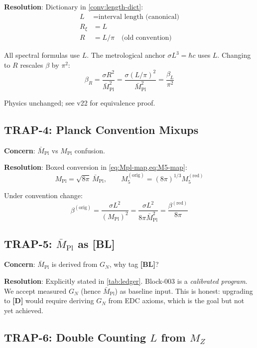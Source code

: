 \documentclass[11pt,a4paper]{article}
\newcommand{\Mpl}{\bar{M}_{\mathrm{Pl}}}
\newcommand{\MplOrig}{M_{\mathrm{Pl}}}
\newcommand{\Mfive}{M_5}
\newcommand{\Rxi}{R_\xi}
\newcommand{\MZ}{M_Z}
\newcommand{\tagD}{\textbf{[D]}}
\newcommand{\tagBL}{\textbf{[BL]}}
\theoremstyle{definition}
\theoremstyle{plain}
\theoremstyle{remark}
\begin{document}
\textbf{Resolution}: Dictionary in \cref{conv:length-dict}:
\begin{align}
L &= \text{interval length (canonical)} \\
\Rxi &= L \\
R &= L/\pi \quad \text{(old convention)}
\end{align}

All spectral formulas use $L$. The metrological anchor $\sigma L^3 = \hbar c$ uses $L$.
Changing to $R$ rescales $\beta$ by $\pi^2$:
\begin{equation}
\beta_R = \frac{\sigma R^2}{\Mpl^2} = \frac{\sigma (L/\pi)^2}{\Mpl^2} = \frac{\beta_L}{\pi^2}
\label{eq:beta-convention-change}
\end{equation}

Physics unchanged; see v22 for equivalence proof.

\subsection{TRAP-4: Planck Convention Mixups}
\label{sec:trap4}

\textbf{Concern}: $\Mpl$ vs $\MplOrig$ confusion.

\textbf{Resolution}: Boxed conversion in \cref{eq:Mpl-map,eq:M5-map}:
\begin{equation}
\MplOrig = \sqrt{8\pi}\,\Mpl, \qquad \Mfive^{(\text{orig})} = (8\pi)^{1/3}\Mfive^{(\text{red})}
\end{equation}

Under convention change:
\begin{equation}
\beta^{(\text{orig})} = \frac{\sigma L^2}{(\MplOrig)^2} = \frac{\sigma L^2}{8\pi\Mpl^2}
= \frac{\beta^{(\text{red})}}{8\pi}
\label{eq:beta-planck-change}
\end{equation}

\subsection{TRAP-5: $\Mpl$ as [BL]}
\label{sec:trap5}

\textbf{Concern}: $\Mpl$ is derived from $G_N$, why tag \tagBL{}?

\textbf{Resolution}: Explicitly stated in \cref{tab:ledger}. Block-003 is a
\emph{calibrated program}. We accept measured $G_N$ (hence $\Mpl$) as baseline input.
This is honest: upgrading to \tagD{} would require deriving $G_N$ from EDC axioms,
which is the goal but not yet achieved.

\subsection{TRAP-6: Double Counting $L$ from $\MZ$}
\label{sec:trap6}
\end{document}
